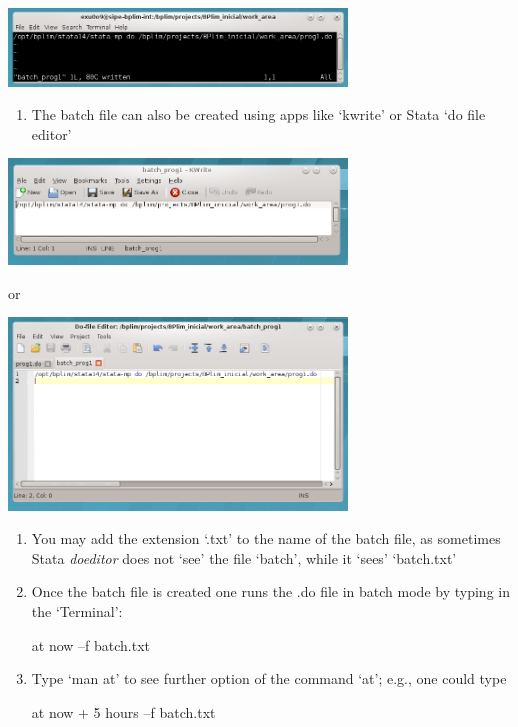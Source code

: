 \documentclass[]{book}
\providecommand{\tightlist}{%
  \setlength{\itemsep}{0pt}\setlength{\parskip}{0pt}}
\begin{document}
\includegraphics[width=3.54331in,height=0.81802in]{./media/image14.png}

\begin{enumerate}
\def\labelenumi{\arabic{enumi}.}
\setcounter{enumi}{5}
\tightlist
\item
  The batch file can also be created using apps like `kwrite' or Stata
  `do file editor'
\end{enumerate}

\includegraphics[width=3.54331in,height=1.11324in]{./media/image15.png}

or

\includegraphics[width=3.54331in,height=2.01342in]{./media/image16.png}

\begin{enumerate}
\def\labelenumi{\arabic{enumi}.}
\setcounter{enumi}{6}
\item
  You may add the extension `.txt' to the name of the batch file, as
  sometimes Stata \emph{doeditor} does not `see' the file `batch', while
  it `sees' `batch.txt'
\item
  Once the batch file is created one runs the .do file in batch mode
  by typing in the `Terminal':

  at now --f batch.txt
\item
  Type `man at' to see further option of the command `at'; e.g., one
  could type

  at now + 5 hours --f batch.txt
\end{enumerate}
\end{document}
